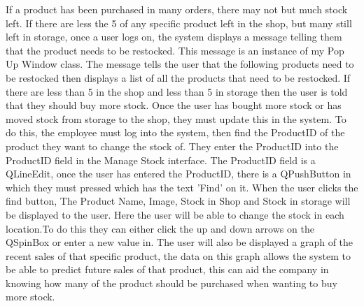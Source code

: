 If a product has been purchased in many orders, there may not but much stock left. If there are less the 5 of any specific product left in the shop, but many still left in storage, once a user logs on, the system displays a message telling them that the product needs to be restocked. This message is an instance of my Pop Up Window class. The message tells the user that the following products need to be restocked then displays a list of all the products that need to be restocked. If there are less than 5 in the shop and less than 5 in storage then the user is told that they should buy more stock. Once the user has bought more stock or has moved stock from storage to the shop, they must update this in the system. To do this, the employee must log into the system, then find the ProductID of the product they want to change the stock of. They enter the ProductID into the ProductID field in the Manage Stock interface. The ProductID field is a QLineEdit, once the user has entered the ProductID, there is a QPushButton in which they must pressed which has the text 'Find' on it. When the user clicks the find button, The Product Name, Image, Stock in Shop and Stock in storage will be displayed to the user. Here the user will be able to change the stock in each location.To do this they can either click the up and down arrows on the QSpinBox or enter a new value in. The user will also be displayed a graph of the recent sales of that specific product, the data on this graph allows the system to be able to predict future sales of that product, this can aid the company in knowing how many of the product should be purchased when wanting to buy more stock.

